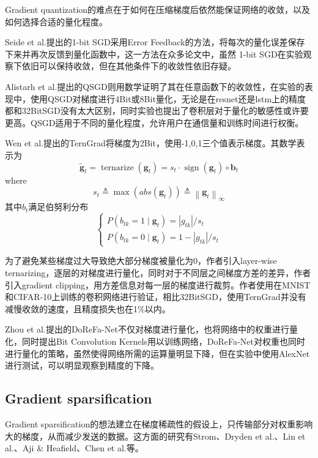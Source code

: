 \documentclass[12pt,onecolumn,letterpaper]{article}
\begin{document}
    Gradient quantization的难点在于如何在压缩梯度后依然能保证网络的收敛，以及如何选择合适的量化程度。

    Seide et al.\cite{Seide2014}提出的1-bit SGD采用Error Feedback的方法，将每次的量化误差保存下来并再次反馈到量化函数中，这一方法在众多论文中，虽然 1-bit SGD在实验观察下依旧可以保持收敛，但在其他条件下的收敛性依旧存疑。
    
    Alistarh et al.\cite{Alistarh}提出的QSGD则用数学证明了其在任意函数下的收敛性，在实验的表现中，使用QSGD对梯度进行4Bit或8Bit量化，无论是在resnet还是lstm上的精度都和32BitSGD没有太大区别，同时实验也提出了卷积层对于量化的敏感性或许要更高。QSGD适用于不同的量化程度，允许用户在通信量和训练时间进行权衡。

    Wen et al.\cite{Wen}提出的TernGrad将梯度为2Bit，使用-1,0,1三个值表示梯度。其数学表示为
    \[
        \tilde{\boldsymbol{g}}_{t}=\operatorname{ternarize}\left(\boldsymbol{g}_{t}\right)=s_{t} \cdot \operatorname{sign}\left(\boldsymbol{g}_{t}\right) \circ \boldsymbol{b}_{t}
    \]
    where
    \[
        s_{t} \triangleq \max \left(a b s\left(\boldsymbol{g}_{t}\right)\right) \triangleq\left\|\boldsymbol{g}_{t}\right\|_{\infty}
    \]
    其中$b_t$满足伯努利分布
    \[
        \left\{\begin{array}{l}
        P\left(b_{t k}=1 \mid \boldsymbol{g}_{t}\right)=\left|g_{t k}\right| / s_{t} \\
        P\left(b_{t k}=0 \mid \boldsymbol{g}_{t}\right)=1-\left|g_{t k}\right| / s_{t}
        \end{array}\right.
    \]

    为了避免某些梯度过大导致绝大部分梯度被量化为0，作者引入layer-wise ternarizing，逐层的对梯度进行量化，同时对于不同层之间梯度方差的差异，作者引入gradient clipping，用方差信息对每一层的梯度进行裁剪。作者使用在MNIST和CIFAR-10上训练的卷积网络进行验证，相比32BitSGD，使用TernGrad并没有减慢收敛的速度，且精度损失也在1\%以内。

    Zhou et al.\cite{Zhou}提出的DoReFa-Net不仅对梯度进行量化，也将网络中的权重进行量化，同时提出Bit Convolution Kernels用以训练网络，DoReFa-Net对权重也同时进行量化的策略，虽然使得网络所需的运算量明显下降，但在实验中使用AlexNet进行测试，可以明显观察到精度的下降。



    \subsection{Gradient sparsification}
    Gradient sparsification的想法建立在梯度稀疏性的假设上，只传输部分对权重影响大的梯度，从而减少发送的数据。这方面的研究有Strom\cite{International}、Dryden et al.\cite{Dryden2016}、Lin et al.\cite{Lin2017}、Aji \& Heafield\cite{Aji2017}、Chen et al.\cite{Chen}等。
\end{document}
